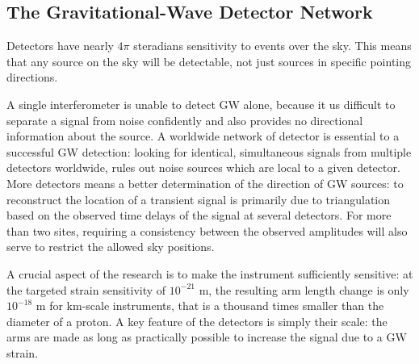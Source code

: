 \documentclass[binding=0.6cm, LaM]{sapthesis}
\begin{document}
\subsection{The Gravitational-Wave Detector Network}
	Detectors have nearly $4\pi$ steradians sensitivity to events over the sky. 
	This means that any source on the sky will be detectable,
        not just sources in specific pointing directions.

	A single interferometer is unable to detect GW alone,
	because it us difficult to separate a signal from noise confidently 
	and also provides no directional information about the source.
	A worldwide network of detector is essential to a successful GW detection:
	looking for identical, simultaneous signals from multiple detectors worldwide, 
	rules out noise sources which are local to a given detector. 
	More detectors means a better determination of the direction of GW sources: 
	to reconstruct the location of a transient signal is primarily due to triangulation 
	based on the observed time delays of the signal at several detectors. 
	For more than two sites, requiring a consistency between the observed amplitudes 
	will also serve to restrict the allowed sky positions\cite{12}.

	A crucial aspect of the research is to make the instrument sufficiently sensitive:
        at the targeted strain sensitivity of $10^{−21}$ m, the resulting arm length change is only $ 10^{-18}$ m for km-scale instruments, that is
        a thousand times smaller than the diameter of a proton.
        A key feature of the detectors is simply their scale:
        the arms are made as long as practically possible to increase the signal due to a GW strain.
\end{document}

